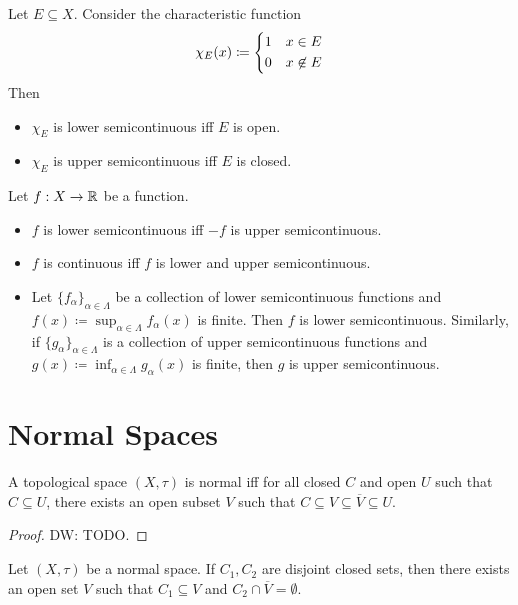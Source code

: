 \documentclass{techreport}
\newcommand{\diw}[1]{{\color{Red} DW: #1}}
\begin{document}
\begin{example}\label{Exa:IndicatorsSemiCont}
	Let $E \subseteq X$.
	Consider the characteristic function
	\[
	\chi_E(x) \coloneqq
	\begin{dcases}
 		1 & x \in E \\
 		0 & x \not\in E
 	\end{dcases}
	\]
	Then
	\begin{itemize}
		\item $\chi_E$ is lower semicontinuous iff $E$ is open.
		\item $\chi_E$ is upper semicontinuous iff $E$ is closed.
	\end{itemize} 	
\end{example}

\begin{lemma}\label{Lem:SomeFactsAboutSemiCont}
	Let $f : X \to \mathbb{R}$ be a function.
	\begin{itemize}
		\item $f$ is lower semicontinuous iff $-f$ is upper semicontinuous.
		\item $f$ is continuous iff $f$ is lower and upper semicontinuous.
		\item Let $\{f_\alpha\}_{\alpha \in \Lambda}$ be a collection of lower semicontinuous functions and $f(x) \coloneqq \sup_{\alpha \in \Lambda} f_{\alpha}(x)$ is finite.
		Then $f$ is lower semicontinuous.
		Similarly, if $\{g_\alpha\}_{\alpha \in \Lambda}$ is a collection of upper semicontinuous functions and $g(x) \coloneqq \inf_{\alpha \in \Lambda} g_\alpha(x)$ is finite, then $g$ is upper semicontinuous.
	\end{itemize}
\end{lemma}

\section{Normal Spaces}

\begin{lemma}\label{Lem:NormalIffNeighborContainClosure}
	A topological space $(X,\tau)$ is normal iff for all closed $C$ and open $U$ such that $C \subseteq U$, there exists an open subset $V$ such that $C \subseteq V \subseteq \overline{V} \subseteq U$.
\end{lemma}
\begin{proof}
	\diw{TODO.}
\end{proof}

\begin{corollary}\label{Cor:NormalIffNeighborContainClosure}
	Let $(X,\tau)$ be a normal space.
	If $C_1,C_2$ are disjoint closed sets, then there exists an open set $V$ such that $C_1 \subseteq V$ and $C_2 \cap \overline{V} =\emptyset$.
\end{corollary}
\end{document}
